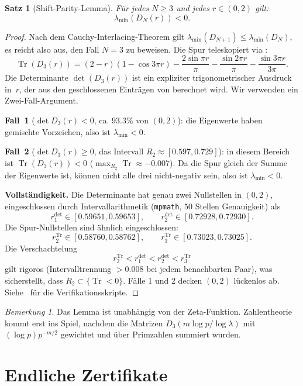 \documentclass[11pt,a4paper]{article}
\newtheorem{theorem}{Satz}[section]
\theoremstyle{remark}
\newtheorem{remark}[remark]{Bemerkung}
\theoremstyle{plain}
\DeclareMathOperator{\Tr}{Tr}
\begin{document}
\begin{theorem}[Shift-Parity-Lemma]
\label{thm:shift-parity}
Für jedes $N\geq 3$ und jedes $r\in(0,2)$ gilt:
\[
  \lambda_{\min}(D_N(r))<0.
\]
\end{theorem}

\begin{proof}
Nach dem Cauchy-Interlacing-Theorem gilt $\lambda_{\min}(D_{N+1})\leq\lambda_{\min}(D_N)$, es reicht also aus, den Fall $N=3$ zu beweisen. Die Spur teleskopiert via :
\[
  \Tr(D_3(r))=(2-r)(1-\cos 3\pi r)
  -\frac{2\sin\pi r}{\pi}
  -\frac{\sin 2\pi r}{\pi}
  -\frac{\sin 3\pi r}{3\pi}.
\]
Die Determinante $\det(D_3(r))$ ist ein expliziter trigonometrischer Ausdruck in~$r$, der aus den geschlossenen Einträgen von  berechnet wird. Wir verwenden ein Zwei-Fall-Argument.

\smallskip\noindent\textbf{Fall~1} ($\det D_3(r)<0$, ca. $93.3\%$ von $(0,2)$): die Eigenwerte haben gemischte Vorzeichen, also ist $\lambda_{\min}<0$.

\smallskip\noindent\textbf{Fall~2} ($\det D_3(r)\geq 0$, das Intervall $R_2\approx[0.597,0.729]$): in diesem Bereich ist $\Tr(D_3(r))<0$ ($\max_{R_2}\Tr\approx -0.007$). Da die Spur gleich der Summe der Eigenwerte ist, können nicht alle drei nicht-negativ sein, also ist $\lambda_{\min}<0$.

\smallskip\noindent\textbf{Vollständigkeit.} Die Determinante hat genau zwei Nullstellen in $(0,2)$, eingeschlossen durch Intervallarithmetik (\texttt{mpmath}, $50$ Stellen Genauigkeit) als
\[
  r_1^{\det}\in[0.59651,0.59653],\qquad r_2^{\det}\in[0.72928,0.72930].
\]
Die Spur-Nullstellen sind ähnlich eingeschlossen:
\[
  r_2^{\Tr}\in[0.58760,0.58762],\qquad r_3^{\Tr}\in[0.73023,0.73025].
\]
Die Verschachtelung
\[
  r_2^{\Tr}<r_1^{\det}<r_2^{\det}<r_3^{\Tr}
\]
gilt rigoros (Intervalltrennung $>0.008$ bei jedem benachbarten Paar), was sicherstellt, dass $R_2\subset\{\Tr<0\}$. Fälle 1 und 2 decken $(0,2)$ lückenlos ab. Siehe~\cite{GeigerLandscapeII} für die Verifikationsskripte.
\end{proof}

\begin{remark}
Das Lemma ist unabhängig von der Zeta-Funktion. Zahlentheorie kommt erst ins Spiel, nachdem die Matrizen $D_3(m\log p/\log\lambda)$ mit $(\log p)p^{-m/2}$ gewichtet und über Primzahlen summiert wurden.
\end{remark}

\section{Endliche Zertifikate}
\label{sec:finite-certificates}
\end{document}
